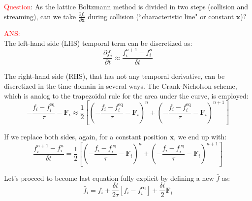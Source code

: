 \documentclass{article}
\begin{document}
	\textcolor{red}{Question}: As the lattice Boltzmann method is divided in two steps (collision and streaming), can we take $\frac{\partial f_i}{\partial \mathbf{x}}$ during collision (``characteristic line" or constant $\mathbf{x}$)?
	
	\textcolor{red}{ANS:}\\
	
	The left-hand side (LHS) temporal term can be discretized as:
	\begin{equation*}
		\frac{\partial f_i}{\partial t} \approx \frac{f^{n+1}_i - f^{n}_i}{\delta t}
	\end{equation*}
	
	The right-hand side (RHS), that has not any temporal derivative, can be discretized in the time domain in several ways. The Crank-Nicholson scheme, which is analog to the trapezoidal rule for the area under the curve, is employed: 
	\begin{equation*}
		-\frac{f_i - f^{\text{eq}}_i}{\tau} - \mathbf{F}_i \approx \frac{1}{2}  \left[ \left( - \frac{f_i - f^{\text{eq}}_i}{\tau} - \mathbf{F}_i \right)^{n} + \left( - \frac{f_i - f^{\text{eq}}_i}{\tau} - \mathbf{F}_i \right)^{n+1} \right]
	\end{equation*}
	
	If we replace both sides, again, for a constant position $\mathbf{x}$, we end up with:
	\begin{equation}\label{eq:originalLBM}
		 \frac{f^{n+1}_i - f^{n}_i}{\delta t}  = \frac{1}{2}  \left[ \left( - \frac{f_i - f^{\text{eq}}_i}{\tau} - \mathbf{F}_i \right)^{n} + \left( - \frac{f_i - f^{\text{eq}}_i}{\tau} - \mathbf{F}_i \right)^{n+1} \right]
	\end{equation}
	
	Let's proceed to become last equation fully explicit by defining a new $\bar{f}$ as:
	\begin{equation}\label{eq:redefineDF}
		\bar{f}_i = f_i + \frac{\delta t}{2\tau} [f_i-f^{\text{eq}}_i] +\frac{\delta t}{2} \mathbf{F}_i
	\end{equation}
	
\end{document}
